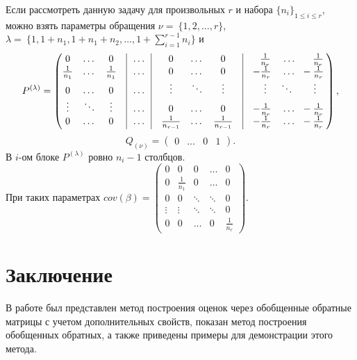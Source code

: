 \documentclass{spisok-article}
\theoremstyle{definition}
\begin{document}
Если рассмотреть данную задачу для произвольных $r$ и набора $\{n_i\}_{1 \leq i \leq r}$, можно взять параметры обращения $\nu =~ \{1,2,\dots, r\}$, $\lambda =~ \{1, 1 + n_1, 1 + n_1 + n_2,\dots, 1+\sum_{i=1}^{r-1}n_i\}$ и 
\[P^{(\lambda)} = 
\begin{pmatrix}
0 			   & \dots & 0 				 & \vline\ \   \dots\ \  \vline &0 			   & \dots & 0 				 	 	  & \vline & \ \ \frac{1}{n_r} & \dots\ \ \ \  \ \frac{1}{n_r}\\
\frac{1}{n_1}  & \dots & \frac{1}{n_1}  & \vline\ \   \dots\ \  \vline &0 			   & \dots & 0 				 	  & \vline & -\frac{1}{n_r} & \dots \ \ -\frac{1}{n_r}\\
0 &  \dots 		& 0 					 & \vline\ \   \dots\ \  \vline &\vdots		   & \ddots & \vdots 		 	  & \vline & \ \ \vdots & \ddots\ \ \ \ \  \ \vdots\ \ \ \\
\vdots & \ddots & \vdots 				 & \vline\ \   \dots\ \  \vline &0 			   & \dots & 0 				 	 	  & \vline & -\frac{1}{n_r} & \dots \ \  -\frac{1}{n_r} \\
0 & \dots 		& 0 					 & \vline\ \   \dots\ \  \vline &\frac{1}{n_{r-1}}  & \dots & \frac{1}{n_{r-1}} & \vline & -\frac{1}{n_r} & \dots \ \  -\frac{1}{n_r}\\
\end{pmatrix}, \]
\[Q_{(\nu)} = \begin{pmatrix}
0 & \dots & 0 & 1
\end{pmatrix}.\] 
В $i$-ом блоке $P^{(\lambda)}$ ровно $n_i - 1$ столбцов. \\ При таких параметрах $cov(\beta) = \begin{pmatrix}
0 & 0 & 0& \dots & 0  \\
0 & \frac{1}{n_1} & 0 & \dots & 0 \\
0 & 0 & \ddots & \ddots & 0 \\
\vdots & \vdots & \ddots & \ddots & 0 \\
0 & 0 &\dots &0 & \frac{1}{n_r}
\end{pmatrix}.
$

\newpage

\section{Заключение}
В работе был представлен метод построения оценок через обобщенные обратные матрицы с учетом дополнительных свойств, показан метод построения обобщенных обратных, а также приведены примеры для демонстрации этого метода. 
\end{document}
